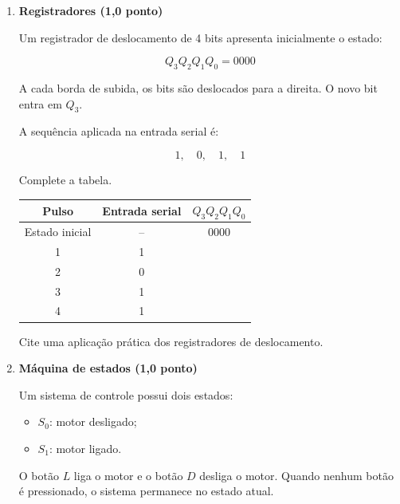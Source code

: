 \documentclass[a4paper,12pt]{article}
\begin{document}
\begin{enumerate}[
    leftmargin=0.8cm,
    label=\textbf{\arabic*.},
    itemsep=0.7cm
]
\newpage


\item \textbf{Registradores \hfill (1,0 ponto)}

Um registrador de deslocamento de 4 bits apresenta inicialmente o estado:

\[
Q_3Q_2Q_1Q_0=0000
\]

A cada borda de subida, os bits são deslocados para a direita. O novo bit entra
em $Q_3$.

A sequência aplicada na entrada serial é:

\[
1,\quad 0,\quad 1,\quad 1
\]

Complete a tabela.

\begin{center}
\renewcommand{\arraystretch}{1.5}

\begin{tabular}{|c|c|c|}
\hline
\textbf{Pulso} & \textbf{Entrada serial} & $Q_3Q_2Q_1Q_0$ \\
\hline
Estado inicial & -- & 0000 \\
\hline
1 & 1 & \\
\hline
2 & 0 & \\
\hline
3 & 1 & \\
\hline
4 & 1 & \\
\hline
\end{tabular}
\end{center}

Cite uma aplicação prática dos registradores de deslocamento.

\vspace{1.2cm}


\item \textbf{Máquina de estados \hfill (1,0 ponto)}

Um sistema de controle possui dois estados:

\begin{itemize}[itemsep=1pt]
    \item $S_0$: motor desligado;
    \item $S_1$: motor ligado.
\end{itemize}

O botão $L$ liga o motor e o botão $D$ desliga o motor. Quando nenhum botão é
pressionado, o sistema permanece no estado atual.


\end{enumerate}
\end{document}
